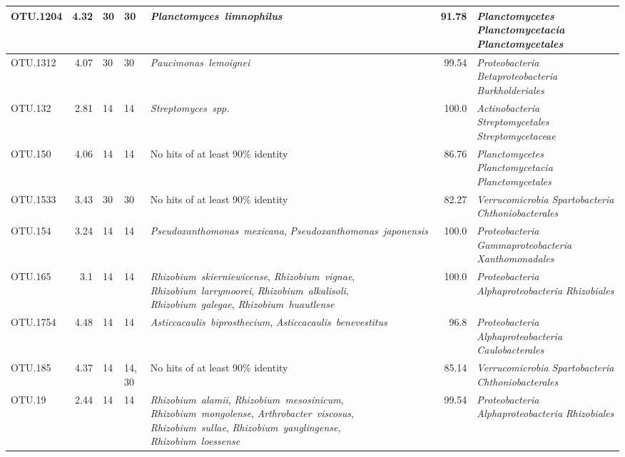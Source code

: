 \begin{ThreePartTable}
\begin{longtable}{P{1.5cm}rP{1cm}P{1.5cm}P{4cm}rP{5cm}}
OTU.1204 & 4.32 & 30 & 30&\mbox{\textit{Planctomyces limnophilus}} & 91.78 & \mbox{\textit{Planctomycetes}} \mbox{\textit{Planctomycetacia}} \mbox{\textit{Planctomycetales}} \\ \midrule
OTU.1312 & 4.07 & 30 & 30&\mbox{\textit{Paucimonas lemoignei}} & 99.54 & \mbox{\textit{Proteobacteria}} \mbox{\textit{Betaproteobacteria}} \mbox{\textit{Burkholderiales}} \\ \midrule
OTU.132 & 2.81 & 14 & 14&\mbox{\textit{Streptomyces spp.}} & 100.0 & \mbox{\textit{Actinobacteria}} \mbox{\textit{Streptomycetales}} \mbox{\textit{Streptomycetaceae}} \\ \midrule
OTU.150 & 4.06 & 14 & 14&{No hits of at least 90\% identity} & 86.76 & \mbox{\textit{Planctomycetes}} \mbox{\textit{Planctomycetacia}} \mbox{\textit{Planctomycetales}} \\ \midrule
OTU.1533 & 3.43 & 30 & 30&{No hits of at least 90\% identity} & 82.27 & \mbox{\textit{Verrucomicrobia}} \mbox{\textit{Spartobacteria}} \mbox{\textit{Chthoniobacterales}} \\ \midrule
OTU.154 & 3.24 & 14 & 14&\mbox{\textit{Pseudoxanthomonas mexicana}}, \mbox{\textit{Pseudoxanthomonas japonensis}} & 100.0 & \mbox{\textit{Proteobacteria}} \mbox{\textit{Gammaproteobacteria}} \mbox{\textit{Xanthomonadales}} \\ \midrule
OTU.165 & 3.1 & 14 & 14&\mbox{\textit{Rhizobium skierniewicense}}, \mbox{\textit{Rhizobium vignae}}, \mbox{\textit{Rhizobium larrymoorei}}, \mbox{\textit{Rhizobium alkalisoli}}, \mbox{\textit{Rhizobium galegae}}, \mbox{\textit{Rhizobium huautlense}} & 100.0 & \mbox{\textit{Proteobacteria}} \mbox{\textit{Alphaproteobacteria}} \mbox{\textit{Rhizobiales}} \\ \midrule
OTU.1754 & 4.48 & 14 & 14&\mbox{\textit{Asticcacaulis biprosthecium}}, \mbox{\textit{Asticcacaulis benevestitus}} & 96.8 & \mbox{\textit{Proteobacteria}} \mbox{\textit{Alphaproteobacteria}} \mbox{\textit{Caulobacterales}} \\ \midrule
OTU.185 & 4.37 & 14 & 14, 30&{No hits of at least 90\% identity} & 85.14 & \mbox{\textit{Verrucomicrobia}} \mbox{\textit{Spartobacteria}} \mbox{\textit{Chthoniobacterales}} \\ \midrule
OTU.19 & 2.44 & 14 & 14&\mbox{\textit{Rhizobium alamii}}, \mbox{\textit{Rhizobium mesosinicum}}, \mbox{\textit{Rhizobium mongolense}}, \mbox{\textit{Arthrobacter viscosus}}, \mbox{\textit{Rhizobium sullae}}, \mbox{\textit{Rhizobium yanglingense}}, \mbox{\textit{Rhizobium loessense}} & 99.54 & \mbox{\textit{Proteobacteria}} \mbox{\textit{Alphaproteobacteria}} \mbox{\textit{Rhizobiales}} \\ \midrule

\end{longtable}
\end{ThreePartTable}
